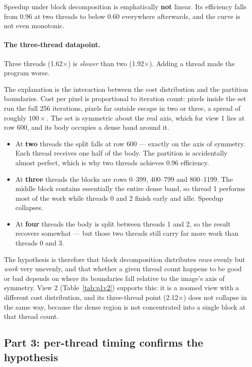 \documentclass[11pt,a4paper]{article}
\begin{document}
Speedup under block decomposition is emphatically \textbf{not} linear. Its
efficiency falls from 0.96 at two threads to below 0.60 everywhere
afterwards, and the curve is not even monotonic.

\paragraph{The three-thread datapoint.} Three threads (1.62$\times$) is
\emph{slower} than two (1.92$\times$). Adding a thread made the program worse.

The explanation is the interaction between the cost distribution and the
partition boundaries. Cost per pixel is proportional to iteration count:
pixels inside the set run the full 256 iterations, pixels far outside escape
in two or three, a spread of roughly $100\times$. The set is symmetric about
the real axis, which for view 1 lies at row 600, and its body occupies a dense
band around it.

\begin{itemize}
\item At \textbf{two} threads the split falls at row 600 --- exactly on the
      axis of symmetry. Each thread receives one half of the body. The
      partition is accidentally almost perfect, which is why two threads
      achieves 0.96 efficiency.
\item At \textbf{three} threads the blocks are rows 0--399, 400--799 and
      800--1199. The middle block contains essentially the entire dense band,
      so thread 1 performs most of the work while threads 0 and 2 finish early
      and idle. Speedup collapses.
\item At \textbf{four} threads the body is split between threads 1 and 2, so
      the result recovers somewhat --- but those two threads still carry far
      more work than threads 0 and 3.
\end{itemize}

The hypothesis is therefore that block decomposition distributes \emph{rows}
evenly but \emph{work} very unevenly, and that whether a given thread count
happens to be good or bad depends on where its boundaries fall relative to the
image's axis of symmetry. View 2 (Table~\ref{tab:p1v2}) supports this: it is a
zoomed view with a different cost distribution, and its three-thread point
(2.12$\times$) does not collapse in the same way, because the dense region is
not concentrated into a single block at that thread count.

\subsection{Part 3: per-thread timing confirms the hypothesis}
\label{sec:p1part3}
\end{document}

